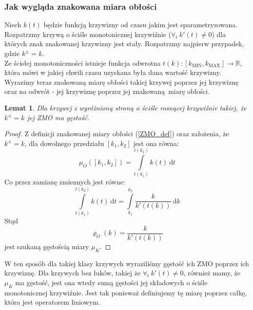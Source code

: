 \documentclass[a4paper, 12pt, twosided]{article}
\newtheorem{lemma}[observation]{Lemat}
\begin{document}
\subsubsection{Jak wygląda znakowana miara obłości}
 Niech $k(t)$ będzie funkcją krzywizny od czasu jakim 
jest
sparametryzowana.
Rozpatrzmy krzywą o ściśle monotonicznej krzywiźnie ($\forall_t\ k'(t) \neq 0$) dla
których znak znakowanej krzywizny jest stały. Rozpatrzmy najpierw przypadek, gdzie 
$k^\pm = k$.
\\
 Ze ścisłej monotoniczności istnieje funkcja odwrotna $t(k) : [k_\text{MIN}, 
k_\text{MAX}]
\to \mathbb{R}$, która mówi w jakiej chwili czasu uzyskana była dana wartość krzywizny. \\
Wyrazimy teraz znakowaną miarę obłości takiej krzywej poprzez jej krzywiznę oraz na odwrót - jej 
krzywiznę
poprzez jej znakowaną miarę obłości. \\
\begin{lemma}
    Dla krzywej z wyróżnioną stroną o ściśle rosnącej krzywiźnie takiej, że 
    $k^\pm = k$ jej ZMO ma gęstość.
\end{lemma}
\begin{proof}
    Z definicji znakowanej miary obłości (\ref{ZMO_def}) oraz założenia, że $k^\pm = k$, dla
     dowolnego przedziału $[k_1, k_2]$ jest ona równa:
    \begin{equation}
        \mu_O([k_1, k_2]) = \displaystyle\int\limits_{t(k_1)}^{t(k_2)}k(t)\ \text{d}t
    \end{equation}
    Co przez zamianę zmiennych jest równe:
    \begin{equation}
        \displaystyle\int\limits_{t(k_1)}^{t(k_2)}k(t)\ \text{d}t =
        \displaystyle\int\limits_{k_1}^{k_2}\frac{k}{k'(t(k))}\ \text{d}k
    \end{equation}
    Stąd
    \begin{equation}
    \varrho_O(k) = \frac{k}{k'(t(k))}
    \end{equation} jest szukaną gęstością miary $\mu_K$.
\end{proof}
W ten sposób dla takiej klasy krzywych wyraziliśmy gęstość ich ZMO poprzez ich krzywiznę. Dla 
krzywych bez
łuków, takiej że $\forall_t\ k'(t) \neq 0$, również mamy, że $\mu_K$ 
ma gęstość, jest ona wtedy sumą gęstości jej składowych o ściśle monotonicznej
krzywiźnie.
Jest tak ponieważ definiujemy tę miarę poprzez całkę, która jest operatorem liniowym. 
\end{document}
